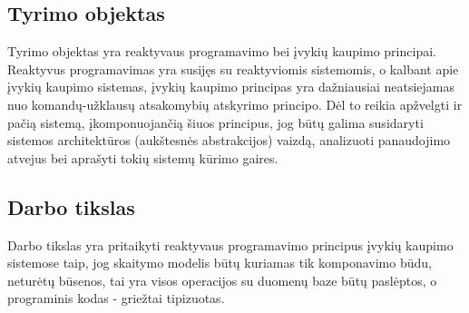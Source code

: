 \subsection{Tyrimo objektas}

    Tyrimo objektas yra reaktyvaus programavimo bei įvykių kaupimo principai. Reaktyvus programavimas yra susijęs su reaktyviomis sistemomis, o kalbant apie įvykių kaupimo sistemas, įvykių kaupimo principas yra dažniausiai neatsiejamas nuo komandų-užklausų atsakomybių atskyrimo principo. Dėl to reikia apžvelgti ir pačią sistemą, įkomponuojančią šiuos principus, jog būtų galima susidaryti sistemos architektūros (aukštesnės abstrakcijos) vaizdą, analizuoti panaudojimo atvejus bei aprašyti tokių sistemų kūrimo gaires.

\subsection{Darbo tikslas}

  Darbo tikslas yra pritaikyti reaktyvaus programavimo principus įvykių kaupimo sistemose taip, jog skaitymo modelis būtų kuriamas tik komponavimo būdu, neturėtų būsenos, tai yra visos operacijos su duomenų baze būtų paslėptos, o programinis kodas - griežtai tipizuotas.








